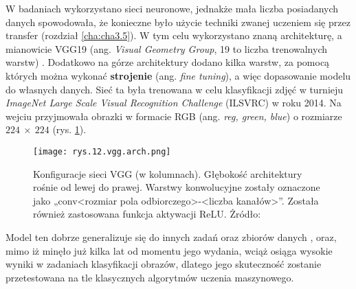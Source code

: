 W badaniach wykorzystano sieci neuronowe, jednakże mała liczba posiadanych danych spowodowała, że konieczne było użycie techniki zwanej uczeniem się przez transfer (rozdział \ref{cha:cha3.5}). W tym celu wykorzystano znaną architekturę, a mianowicie VGG19 (ang. \textit{Visual Geometry Group}, 19 to liczba trenowalnych warstw) \cite{Simonyan15}. Dodatkowo na górze architektury dodano kilka warstw, za pomocą których można wykonać \textbf{strojenie} (ang. \textit{fine tuning}), a więc dopasowanie modelu do własnych danych. Sieć ta była trenowana w celu klasyfikacji zdjęć w turnieju \textit{ImageNet Large Scale Visual Recognition Challenge} (ILSVRC) w roku 2014. Na wejciu przyjmowała obrazki w formacie RGB (ang. \textit{reg, green, blue}) o rozmiarze $224~×~224$ (rys. \ref{fig:mesh12}). 
\begin{figure}[h]
    \centering
    \texttt{[image: rys.12.vgg.arch.png]}
    \caption{Konfiguracje sieci VGG (w kolumnach). Głębokość architektury rośnie od lewej do prawej. Warstwy konwolucyjne zostały oznaczone jako „conv<rozmiar pola odbiorczego>-<liczba kanałów>”. Została również zastosowana funkcja aktywacji ReLU. Żródło: \cite{Simonyan15}}
    \label{fig:mesh12}
\end{figure}
Model ten dobrze generalizuje się do innych zadań oraz zbiorów danych \cite{Simonyan15}, oraz, mimo iż minęło już kilka lat od momentu jego wydania, wciąż osiąga wysokie wyniki w zadaniach klasyfikacji obrazów, dlatego jego skuteczność zostanie przetestowana na tle klasycznych algorytmów uczenia maszynowego. 































































